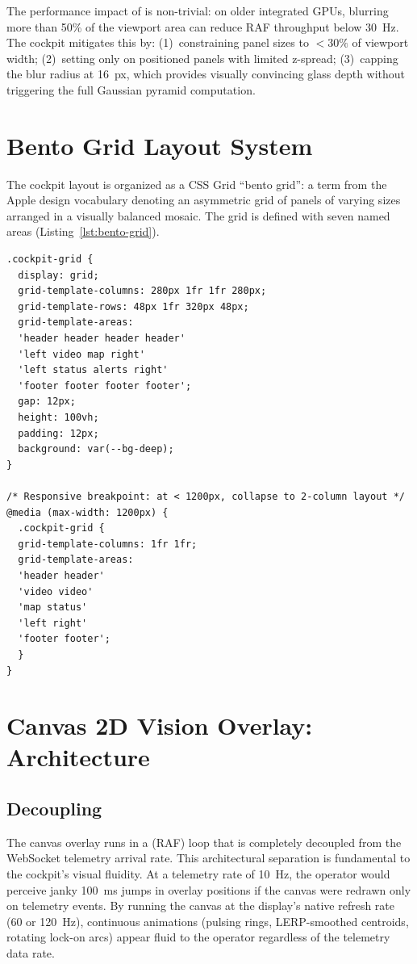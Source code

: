 The performance impact of  is non-trivial: on older integrated GPUs, blurring more than 50\% of the viewport area can reduce RAF throughput below 30~Hz. The cockpit mitigates this by: (1)~constraining panel sizes to $<30\%$ of viewport width; (2)~setting  only on positioned panels with limited z-spread; (3)~capping the blur radius at 16~px, which provides visually convincing glass depth without triggering the full Gaussian pyramid computation.

\section{Bento Grid Layout System}

The cockpit layout is organized as a CSS Grid ``bento grid'': a term from the Apple design vocabulary denoting an asymmetric grid of panels of varying sizes arranged in a visually balanced mosaic. The grid is defined with seven named areas (Listing~\ref{lst:bento-grid}).

\begin{lstlisting}[caption={Bento grid layout with responsive breakpoint}, label={lst:bento-grid}]
.cockpit-grid {
  display: grid;
  grid-template-columns: 280px 1fr 1fr 280px;
  grid-template-rows: 48px 1fr 320px 48px;
  grid-template-areas:
  'header header header header'
  'left video map right'
  'left status alerts right'
  'footer footer footer footer';
  gap: 12px;
  height: 100vh;
  padding: 12px;
  background: var(--bg-deep);
}

/* Responsive breakpoint: at < 1200px, collapse to 2-column layout */
@media (max-width: 1200px) {
  .cockpit-grid {
  grid-template-columns: 1fr 1fr;
  grid-template-areas:
  'header header'
  'video video'
  'map status'
  'left right'
  'footer footer';
  }
}
\end{lstlisting}

\section{Canvas 2D Vision Overlay: Architecture}

\subsection{ Decoupling}

The canvas overlay runs in a  (RAF) loop that is completely decoupled from the WebSocket telemetry arrival rate. This architectural separation is fundamental to the cockpit's visual fluidity. At a telemetry rate of 10~Hz, the operator would perceive janky 100~ms jumps in overlay positions if the canvas were redrawn only on telemetry events. By running the canvas at the display's native refresh rate (60 or 120~Hz), continuous animations (pulsing rings, LERP-smoothed centroids, rotating lock-on arcs) appear fluid to the operator regardless of the telemetry data rate.

